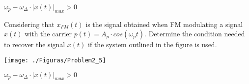 \documentclass[idioma,boletin]{uah}
\begin{document}
\newpage

{
$\omega_p - \omega_\Delta \cdot |x(t)|_{max} > 0$

}
{

	Considering that $x_{FM}(t)$ is the signal obtained when FM modulating a signal $x(t)$ with the carrier $p(t)=A_p \cdot cos(\omega_p t)$. Determine the condition needed to recover the signal $x(t)$ if the system outlined in the figure is used.
	
	{\begin{figure*}[h!]\centering\texttt{[image: ./Figuras/Problem2\_5]}\end{figure*}}
}
{
$\omega_p - \omega_\Delta \cdot |x(t)|_{max} > 0$

}
\end{document}
